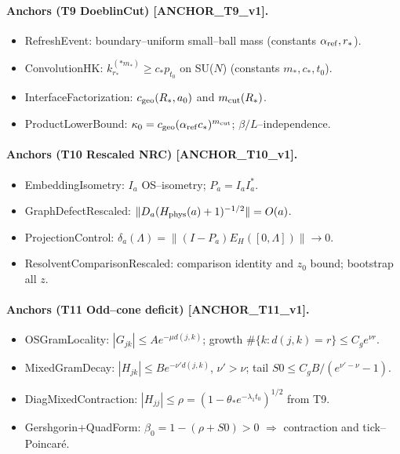 \documentclass[11pt]{amsart}
\theoremstyle{plain}
\theoremstyle{definition}
\theoremstyle{remark}
\begin{document}
\paragraph{Anchors (T9 DoeblinCut) [ANCHOR\_T9\_v1].}
\begin{itemize}
  \item RefreshEvent: boundary–uniform small–ball mass (constants $\alpha_{\rm ref}, r_*$).
  \item ConvolutionHK: $k_{r_*}^{(*m_*)}\ge c_* p_{t_0}$ on SU($N$) (constants $m_*,c_*,t_0$).
  \item InterfaceFactorization: $c_{\rm geo}(R_*,a_0)$ and $m_{\rm cut}(R_*)$.
  \item ProductLowerBound: $\kappa_0=c_{\rm geo}(\alpha_{\rm ref} c_*)^{m_{\rm cut}}$; $\beta/L$–independence.
\end{itemize}

\paragraph{Anchors (T10 Rescaled NRC) [ANCHOR\_T10\_v1].}
\begin{itemize}
  \item EmbeddingIsometry: $I_a$ OS–isometry; $P_a=I_a I_a^*$.
  \item GraphDefectRescaled: $\|D_a(H_{\rm phys}(a)+1)^{-1/2}\|=O(a)$.
  \item ProjectionControl: $\delta_a(\Lambda)=\|(I-P_a)E_H([0,\Lambda])\|\to 0$.
  \item ResolventComparisonRescaled: comparison identity and $z_0$ bound; bootstrap all $z$.
\end{itemize}

\paragraph{Anchors (T11 Odd–cone deficit) [ANCHOR\_T11\_v1].}
\begin{itemize}
  \item OSGramLocality: $|G_{jk}|\le A e^{-\mu d(j,k)}$; growth $\#\{k: d(j,k)=r\}\le C_g e^{\nu r}$.
  \item MixedGramDecay: $|H_{jk}|\le B e^{-\nu' d(j,k)}$, $\nu'>\nu$; tail $S0\le C_g B/(e^{\nu'-\nu}-1)$.
  \item DiagMixedContraction: $|H_{jj}|\le \rho=(1-\theta_* e^{-\lambda_1 t_0})^{1/2}$ from T9.
  \item Gershgorin+QuadForm: $\beta_0=1-(\rho+S0)>0$ $\Rightarrow$ contraction and tick–Poincaré.
\end{itemize}
\end{document}
